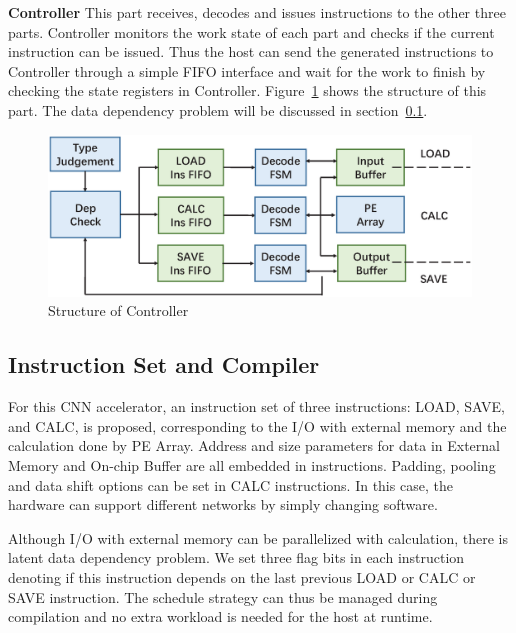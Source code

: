 \documentclass[10pt, conference, compsocconf]{IEEEtran}
\begin{document}
\textbf{Controller} This part receives, decodes and issues instructions to the other three parts. Controller monitors the work state of each part and checks if the current instruction can be issued. Thus the host can send the generated instructions to Controller through a simple FIFO interface and wait for the work to finish by checking the state registers in Controller.  Figure~\ref{fig:controller} shows the structure of this part. The data dependency problem will be discussed in section~\ref{sec:ins_comp}.

\begin{figure}[t]
    \centering
    \includegraphics[width=1.0\columnwidth]{figure/controller.eps}
    \small
    \caption{Structure of Controller}
    \label{fig:controller}
\end{figure}

\subsection{Instruction Set and Compiler} \label{sec:ins_comp}
For this CNN accelerator, an instruction set of three instructions: LOAD, SAVE, and CALC, is proposed, corresponding to the I/O with external memory and the calculation done by PE Array. Address and size parameters for data in External Memory and On-chip Buffer are all embedded in instructions. Padding, pooling and data shift options can be set in CALC instructions. In this case, the hardware can support different networks by simply changing software.

Although I/O with external memory can be parallelized with calculation, there is latent data dependency problem. We set three flag bits in each instruction denoting if this instruction depends on the last previous LOAD or CALC or SAVE instruction. The schedule strategy can thus be managed during compilation and no extra workload is needed for the host at runtime.
\end{document}
